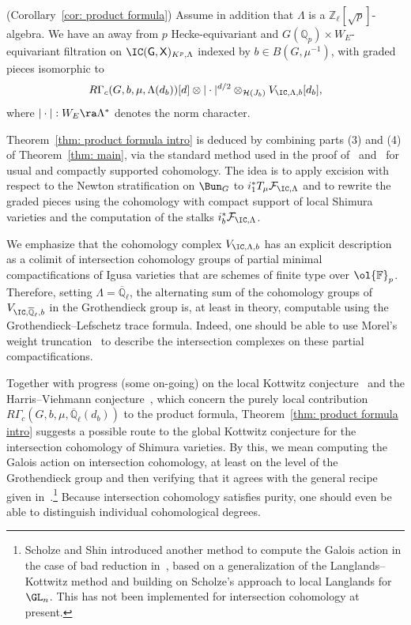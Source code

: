 \documentclass[letterpaper,11pt]{amsart}
\begin{document}
\begin{theorem}\label{thm: product formula intro}{(Corollary~\ref{cor: product formula})} Assume in addition that $\Lambda$ is a $\mathbb{Z}_{\ell}[\sqrt{p}]$-algebra. We have an away from $p$ Hecke-equivariant and $G(\mathbb{Q}_p)\times W_E$-equivariant filtration on $\IC(\mathsf{G},\mathsf{X})_{K^p,\Lambda}$ indexed by $b\in B(G,\mu^{-1})$, with graded pieces isomorphic to 
\[
R\Gamma_{c}(G,b,\mu,\Lambda(d_{b}))[d]\otimes |\cdot|^{d/2} \otimes_{\mathcal{H}(J_{b})} V_{\IC,\Lambda,b}[d_{b}],
\]
where $|\cdot|: W_{E} \ra \Lambda^{*}$ denotes the norm character.
\end{theorem}

Theorem~\ref{thm: product formula intro} is deduced by combining parts (3) and (4) of Theorem~\ref{thm: main},  via the standard method used in the proof of~\cite[Corollary 3.22]{HamannLeeTorsion} and~\cite[Theorem 8.5.7]{DvHKZ} for usual and compactly supported cohomology. The idea is to apply excision with respect to the Newton stratification on $\Bun_G$ to $i_1^*T_\mu\mathcal{F}_{\IC,\Lambda}$ and to rewrite the graded pieces using the cohomology with compact support of local Shimura varieties and the computation of the stalks $i_b^*\mathcal{F}_{\IC,\Lambda}$. 


\begin{remark}\label{rem:kottwitz conjecture}
We emphasize that the cohomology complex $V_{\IC,\Lambda,b}$ has an explicit description as a colimit of intersection cohomology groups of partial minimal compactifications of Igusa varieties that are schemes of finite type over $\ol{\mathbb{F}}_p$. Therefore, setting $\Lambda=\overline{\mathbb{Q}}_{\ell}$, the alternating sum of the cohomology groups of $V_{\IC,\overline{\mathbb{Q}}_{\ell},b}$ in the Grothendieck group is, at least in theory, computable using the Grothendieck--Lefschetz trace formula. Indeed, one should be able to use Morel's weight truncation~\cite{morel-weight} to describe the intersection complexes on these partial compactifications.

Together with progress (some on-going) on the local Kottwitz conjecture~\cite{HKW} and the Harris--Viehmann conjecture~\cite{HHSII}, which concern the purely local contribution $R\Gamma_c(G,b,\mu,\overline{\mathbb{Q}}_{\ell}(d_{b}))$ to the product formula, Theorem~\ref{thm: product formula intro} suggests a possible route to the global Kottwitz conjecture for the intersection cohomology of Shimura varieties. By this, we mean computing the Galois action on intersection cohomology, at least on the level of the Grothendieck group and then verifying that it agrees with the general recipe given in~\cite{kottwitz-galois}.\footnote{Scholze and Shin introduced another method to compute the Galois action in the case of bad reduction in~\cite{scholze-shin}, based on a generalization of the Langlands--Kottwitz method and building on Scholze's approach to local Langlands for $\GL_n$. This has not been implemented for intersection cohomology at present.} Because intersection cohomology satisfies purity, one should even be able to distinguish individual cohomological degrees. 
\end{remark}
\end{document}
